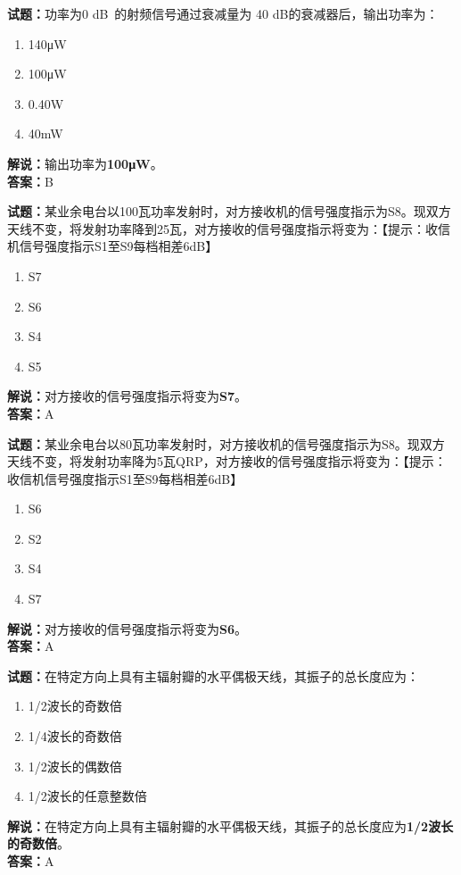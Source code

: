 \documentclass{ctexbook}
\begin{document}
\bigskip


\noindent\textbf{试题：}功率为0 \unit[qualifier-mode=combine]{\deci\bel{}}的射频信号通过衰减量为 40 dB的衰减器后，输出功率为：
\begin{enumerate}[leftmargin=3em]
\item 140μW
\item 100μW
\item 0.40W%
\item 40mW
\end{enumerate}
\noindent\textbf{解说：}输出功率为\textbf{100μW}。\\\noindent\textbf{答案：}B




\bigskip


\noindent\textbf{试题：}某业余电台以100瓦功率发射时，对方接收机的信号强度指示为S8。现双方天线不变，将发射功率降到25瓦，对方接收的信号强度指示将变为：【提示：收信机信号强度指示S1至S9每档相差6dB】
\begin{enumerate}[leftmargin=3em]
\item S7
\item S6
\item S4
\item S5
\end{enumerate}
\noindent\textbf{解说：}对方接收的信号强度指示将变为\textbf{S7}。\\\noindent\textbf{答案：}A



\bigskip


\noindent\textbf{试题：}某业余电台以80瓦功率发射时，对方接收机的信号强度指示为S8。现双方天线不变，将发射功率降为5瓦QRP，对方接收的信号强度指示将变为：【提示：收信机信号强度指示S1至S9每档相差6dB】
\begin{enumerate}[leftmargin=3em]
\item S6
\item S2
\item S4
\item S7
\end{enumerate}
\noindent\textbf{解说：}对方接收的信号强度指示将变为\textbf{S6}。\\\noindent\textbf{答案：}A



\bigskip


\noindent\textbf{试题：}在特定方向上具有主辐射瓣的水平偶极天线，其振子的总长度应为：
\begin{enumerate}[leftmargin=3em]
\item 1/2波长的奇数倍
\item 1/4波长的奇数倍
\item 1/2波长的偶数倍
\item 1/2波长的任意整数倍
\end{enumerate}
\noindent\textbf{解说：}在特定方向上具有主辐射瓣的水平偶极天线，其振子的总长度应为\textbf{1/2波长的奇数倍}。\\\noindent\textbf{答案：}A
\end{document}
